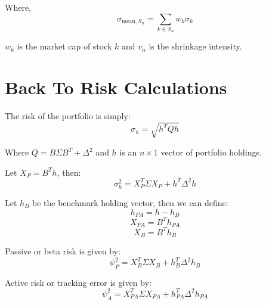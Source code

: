\documentclass{article}
\begin{document}
Where, 
\begin{equation}
\sigma_{\text{mean}, S_n} = \sum_{k \in S_n} w_k \sigma_k
\end{equation}

\( w_k \) is the market cap of stock \( k \) and \( v_n \) is the shrinkage intensity. \\

\section*{Back To Risk Calculations}
The risk of the portfolio is simply:
\begin{equation}
\sigma_h = \sqrt{h^T Q h}
\end{equation}

Where \( Q = B \Sigma B^T + \Delta^2 \) and \( h \) is an \( n \times 1 \) vector of portfolio holdings.

Let \( X_P = B^T h \), then:
\begin{equation}
\sigma_h^2 = X_P^T \Sigma X_P + h^T \Delta^2 h
\end{equation}

Let \( h_B \) be the benchmark holding vector, then we can define:
\begin{equation}
h_{PA} = h - h_B
\end{equation}
\begin{equation}
X_{PA} = B^T h_{PA}
\end{equation}
\begin{equation}
X_B = B^T h_B
\end{equation}

Passive or beta risk is given by:
\begin{equation}
\psi_P^2 = X_B^T \Sigma X_B + h_B^T \Delta^2 h_B
\end{equation}

Active risk or tracking error is given by:
\begin{equation}
\psi_A^2 = X_{PA}^T \Sigma X_{PA} + h_{PA}^T \Delta^2 h_{PA}
\end{equation}
\end{document}
